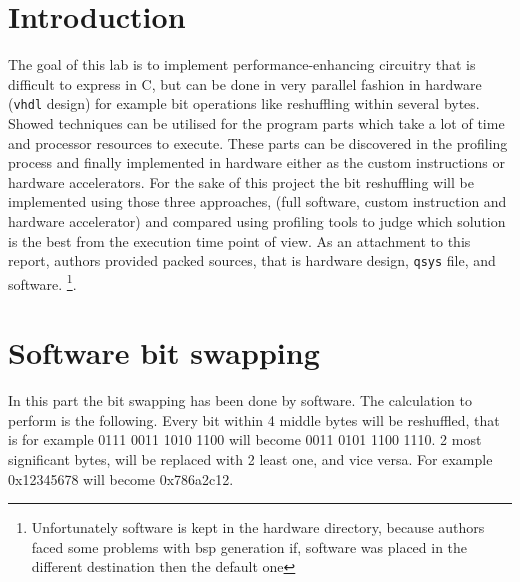 \chapter{Introduction}
The goal of this lab is to implement performance-enhancing circuitry that is difficult to express in C, but can be done in very parallel fashion in hardware (\verb|vhdl| design) for example bit operations like reshuffling within several bytes. Showed techniques can be utilised for the program parts which take a lot of time and processor resources to execute. These parts can be discovered in the profiling process and finally implemented in hardware either as the custom instructions or hardware accelerators. For the sake of this project the bit reshuffling will be implemented using those three approaches, (full software, custom instruction and hardware accelerator) and compared using profiling tools to judge which solution is the best from the execution time point of view. As an attachment to this report, authors provided packed sources, that is hardware design, \verb|qsys| file, and software. \footnote{Unfortunately software is kept in the hardware directory, because authors faced some problems with bsp generation if, software was placed in the different destination then the default one}. 

\begingroup
\renewcommand{\cleardoublepage}{}
\renewcommand{\clearpage}{}
\chapter{Software bit swapping}
\endgroup
In this part the bit swapping has been done by software. The calculation to perform is the following. Every bit within 4 middle bytes will be reshuffled, that is for example 0111 0011 1010 1100 will become 0011 0101 1100 1110. 2 most significant bytes, will be replaced with 2 least one, and vice versa. For example 0x12345678 will become 0x786a2c12.
